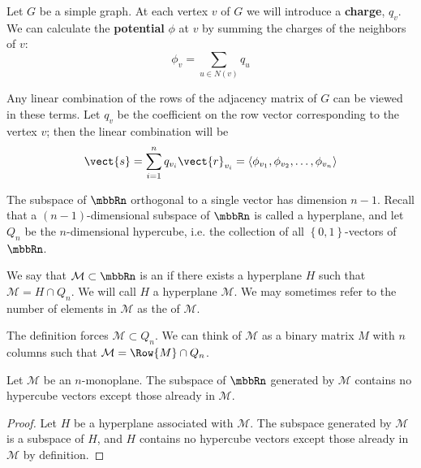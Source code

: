 




\begin{definition}
	Let $G$ be a simple graph. At each vertex $v$ of $G$ we will introduce a \textbf{charge}, $q_v$. We can calculate the \textbf{potential} $\phi$ at $v$ by summing the charges of the neighbors of $v$: \[ \phi_v = \sum_{u \in N\left(v\right)} q_u\]
\end{definition}

Any linear combination of the rows of the adjacency matrix of $G$ can be viewed in these terms. Let $q_v$ be the coefficient on the row vector corresponding to the vertex $v$; then the linear combination will be \[ \vect{s} = \sum_{i=1}^{n} q_{v_i} \vect{r}_{v_i} = \left\langle \phi_{v_1}, \phi_{v_2}, \dotsc, \phi_{v_n} \right\rangle \]

The subspace of $\mbbRn$ orthogonal to a single vector has dimension $n-1$. Recall that a $\left(n-1\right)$-dimensional subspace of $\mbbRn$ is called a hyperplane, and let $Q_{n}$ be the $n$-dimensional hypercube, i.e. the collection of all $\left\{0,1\right\}$-vectors of $\mbbRn$.

\begin{definition}[$n$-monoplane]
	We say that $\mathcal{M}\subset\mbbRn$ is an  if there exists a hyperplane $H$ such that $\mathcal{M}=H\cap Q_{n}$. We will call $H$ a hyperplane  $\mathcal{M}$. We may sometimes refer to the number of elements in $\mathcal{M}$ as the  of $\mathcal{M}$.
\end{definition}

The definition forces $\mathcal{M} \subset Q_{n}$. We can think of $\mathcal{M}$ as a binary matrix $M$ with $n$ columns such that $\mathcal{M} = \Row{M}\cap Q_{n}$.

\begin{proposition}\label{prop:Monoplanes are closed}
	Let $\mathcal{M}$ be an $n$-monoplane. The subspace of $\mbbRn$ generated by $\mathcal{M}$ contains no hypercube vectors except those already in $\mathcal{M}$.
\end{proposition}
\begin{proof}
	Let $H$ be a hyperplane associated with $\mathcal{M}$. The subspace generated by $\mathcal{M}$ is a subspace of $H$, and $H$ contains no hypercube vectors except those already in $\mathcal{M}$ by definition.
\end{proof}

